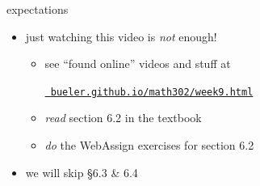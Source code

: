 \documentclass[urlcolor=blue,dvipsnames]{beamer}
\begin{document}
\begin{frame}{expectations}

\begin{itemize}
\item just watching this video is \emph{not} enough!
     \begin{itemize}
     \item see ``found online'' videos and stuff at

     \centerline{\href{https://bueler.github.io/math302/week9.html}{\tt \color{cyan} bueler.github.io/math302/week9.html}}
     \item \emph{read} section 6.2 in the textbook
     \item \emph{do} the WebAssign exercises for section 6.2
     \end{itemize}
\item we will skip \S 6.3 \& 6.4
\end{itemize}
\end{frame}
\end{document}
